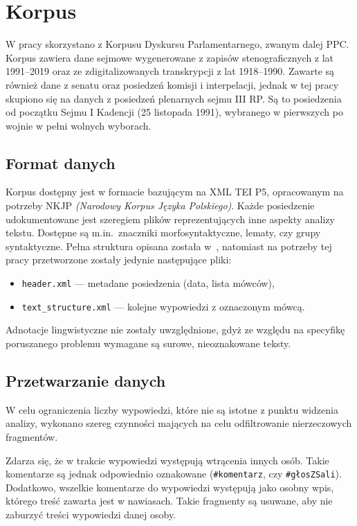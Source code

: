 
\chapter{Korpus}
  W pracy skorzystano z Korpusu Dyskursu Parlamentarnego\cite{PPC}, zwanym dalej PPC\@. 
  Korpus zawiera dane sejmowe wygenerowane z zapisów stenograficznych z lat 1991--2019
    oraz ze zdigitalizowanych transkrypcji z lat 1918--1990.
  Zawarte są również dane z senatu oraz posiedzeń komisji i interpelacji,
    jednak w tej pracy skupiono się na danych z posiedzeń plenarnych sejmu III RP\@.
  Są to posiedzenia od początku Sejmu I Kadencji (25 listopada 1991), wybranego w pierwszych po wojnie w pełni wolnych wyborach.

\section{Format danych}
  Korpus dostępny jest w formacie bazującym na XML TEI P5, opracowanym na potrzeby NKJP \textit{(Narodowy Korpus Języka Polskiego)}.
  Każde posiedzenie udokumentowane jest szeregiem plików reprezentujących inne aspekty analizy tekstu.
  Dostępne są m.in.\ znaczniki morfosyntaktyczne, lematy, czy grupy syntaktyczne.
  Pełna struktura opisana została w~\cite[Ogrodniczuk, 2012]{PSC},
    natomiast na potrzeby tej pracy przetworzone zostały jedynie następujące pliki:
  \begin{itemize}
    \item \verb|header.xml| --- metadane posiedzenia (data, lista mówców),
    \item \verb|text_structure.xml| --- kolejne wypowiedzi z oznaczonym mówcą.
  \end{itemize}
  Adnotacje lingwistyczne nie zostały uwzględnione,
    gdyż ze względu na specyfikę poruszanego problemu wymagane są surowe, nieoznakowane teksty.
  
\section{Przetwarzanie danych}
  W celu ograniczenia liczby wypowiedzi, które nie są istotne z punktu widzenia analizy,
    wykonano szereg czynności mających na celu odfiltrowanie nierzeczowych fragmentów.
  
  Zdarza się, że w trakcie wypowiedzi występują wtrącenia innych osób.
  Takie komentarze są jednak odpowiednio oznakowane (\verb|#komentarz|, czy \verb|#głosZSali|).
  Dodatkowo, wszelkie komentarze do wypowiedzi występują jako osobny wpis, którego treść zawarta jest w nawiasach.
  Takie fragmenty są usuwane, aby nie zaburzyć treści wypowiedzi danej osoby.

